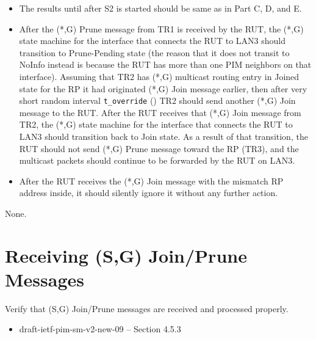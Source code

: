 \documentclass[11pt]{report}
\begin{document}

\begin{itemize}

  \item The results until after S2 is started should be same as in
  Part C, D, and E.

  \item After the (*,G) Prune message from TR1 is received by the RUT,
  the (*,G) state machine for the interface that connects the RUT to
  LAN3 should transition to Prune-Pending state (the reason that it does
  not transit to NoInfo instead is because the RUT has more than one PIM
  neighbors on that interface).
  Assuming that TR2 has (*,G) multicast routing entry in Joined state
  for the RP it had originated (*,G) Join message earlier, then after
  very short random interval \verb=t_override= ({\PimsmTOverride}) TR2
  should send another (*,G) Join message to the RUT.
  After the RUT receives that (*,G) Join message from TR2,
  the (*,G) state machine for the interface that connects the RUT to
  LAN3 should transition back to Join state.
  As a result of that transition, the RUT should not send (*,G) Prune
  message toward the RP (TR3), and the multicast packets should continue
  to be forwarded by the RUT on LAN3.

\end{itemize}


\begin{itemize}
  \item After the RUT receives the (*,G) Join message with the mismatch RP
  address inside, it should silently ignore it without any further action.
\end{itemize}

None.


\newpage
\section{Receiving (S,G) Join/Prune Messages}

Verify that (S,G) Join/Prune messages are received and processed
properly.

\begin{itemize}
  \item draft-ietf-pim-sm-v2-new-09 -- Section 4.5.3
\end{itemize}
\end{document}
